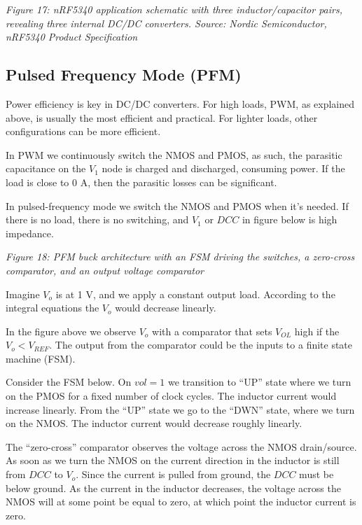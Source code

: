 \emph{Figure 17: nRF5340 application schematic with three
inductor/capacitor pairs, revealing three internal DC/DC converters.
Source: Nordic Semiconductor, nRF5340 Product Specification}

\subsection{Pulsed Frequency Mode
(PFM)}\label{pulsed-frequency-mode-pfm}

Power efficiency is key in DC/DC converters. For high loads, PWM, as
explained above, is usually the most efficient and practical. For
lighter loads, other configurations can be more efficient.

In PWM we continuously switch the NMOS and PMOS, as such, the parasitic
capacitance on the \(V_1\) node is charged and discharged, consuming
power. If the load is close to 0 A, then the parasitic losses can be
significant.

In pulsed-frequency mode we switch the NMOS and PMOS when it's needed.
If there is no load, there is no switching, and \(V_1\) or \(DCC\) in
figure below is high impedance.


{
\centering
{}
}

\emph{Figure 18: PFM buck architecture with an FSM driving the switches,
a zero-cross comparator, and an output voltage comparator}

Imagine \(V_o\) is at 1 V, and we apply a constant output load.
According to the integral equations the \(V_o\) would decrease linearly.

In the figure above we observe \(V_o\) with a comparator that sets
\(V_{OL}\) high if the \(V_o < V_{REF}\). The output from the comparator
could be the inputs to a finite state machine (FSM).

Consider the FSM below. On \(vol=1\) we transition to ``UP'' state where
we turn on the PMOS for a fixed number of clock cycles. The inductor
current would increase linearly. From the ``UP'' state we go to the
``DWN'' state, where we turn on the NMOS. The inductor current would
decrease roughly linearly.

The ``zero-cross'' comparator observes the voltage across the NMOS
drain/source. As soon as we turn the NMOS on the current direction in
the inductor is still from \(DCC\) to \(V_o\). Since the current is
pulled from ground, the \(DCC\) must be below ground. As the current in
the inductor decreases, the voltage across the NMOS will at some point
be equal to zero, at which point the inductor current is zero.

